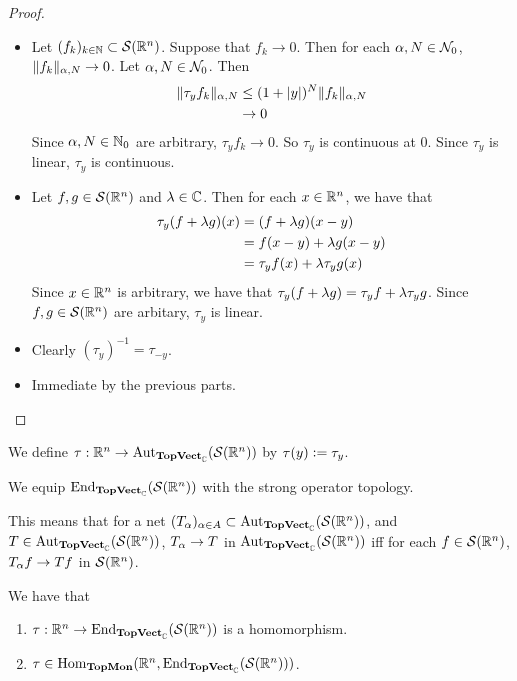 \documentclass{book}
\begin{document}
	\begin{proof}\
		\begin{itemize}
			\item Let $(f_k)_{k \in \mathbb{N}} \subset \mathcal{S}(\mathbb{R}^n)$. Suppose that $f_k \rightarrow 0$. Then for each $\alpha,N \in \mathcal{N}_0$, $\|f_k\|_{\alpha, N} \rightarrow 0$. 
			Let $\alpha,N \in \mathcal{N}_0$. Then 
			\begin{align*}
				\|\tau_yf_k\|_{\alpha, N} 
				& \leq (1 + |y|)^N\|f_k\|_{\alpha, N} \\
				& \rightarrow 0
			\end{align*}
			Since $\alpha, N \in \mathbb{N}_0$ are arbitrary, $\tau_yf_k \rightarrow 0$. So $\tau_y$  is continuous at $0$. Since $\tau_y$ is linear, $\tau_y$ is continuous.
			\item Let $f, g \in \mathcal{S}(\mathbb{R}^n)$ and $\lambda \in \mathbb{C}$. Then for each $x \in \mathbb{R}^n$, we have that
			\begin{align*}
				\tau_y(f + \lambda g)(x) 
				& = (f+ \lambda g)(x-y) \\
				& = f(x -y) + \lambda g(x-y) \\
				& = \tau_y f (x) + \lambda \tau_y g(x)
			\end{align*}
			Since $x \in \mathbb{R}^n$ is arbitrary, we have that $\tau_y (f + \lambda g) = \tau_y f + \lambda \tau_y g$. Since $f, g \in \mathcal{S}(\mathbb{R}^n)$ are arbitary, $\tau_y$ is linear. 
			\item Clearly $(\tau_y)^{-1} = \tau_{-y}$.
			\item Immediate by the previous parts.
		\end{itemize}
	\end{proof}

	\begin{defn}
		We define $\tau: \mathbb{R}^n \rightarrow \operatorname{Aut}_{\operatorname*{\text{\textbf{TopVect}}}_{\mathbb{C}}}(\mathcal{S}(\mathbb{R}^n))$ by $\tau(y) \vcentcolon= \tau_y$.  
	\end{defn}

	\begin{defn}
		We equip $\operatorname{\text{End}}_{\operatorname*{\text{\textbf{TopVect}}}_{\mathbb{C}}}(\mathcal{S}(\mathbb{R}^n))$ with the strong operator topology. 
	\end{defn}

	\begin{note}
		This means that for a net $(T_{\alpha})_{\alpha \in A} \subset \operatorname{Aut}_{\operatorname*{\text{\textbf{TopVect}}}_{\mathbb{C}}}(\mathcal{S}(\mathbb{R}^n))$, and $T \in \operatorname{Aut}_{\operatorname*{\text{\textbf{TopVect}}}_{\mathbb{C}}}(\mathcal{S}(\mathbb{R}^n))$, $T_{\alpha} \rightarrow T$ in $\operatorname{Aut}_{\operatorname*{\text{\textbf{TopVect}}}_{\mathbb{C}}}(\mathcal{S}(\mathbb{R}^n))$ iff for each $f \in \mathcal{S}(\mathbb{R}^n)$, $T_{\alpha}f \rightarrow Tf$ in $\mathcal{S}(\mathbb{R}^n)$. 
	\end{note}

	\begin{ex}
		We have that
		\begin{enumerate}
			\item $\tau: \mathbb{R}^n \rightarrow \operatorname{\text{End}}_{\operatorname*{\text{\textbf{TopVect}}}_{\mathbb{C}}}(\mathcal{S}(\mathbb{R}^n))$ is a homomorphism.
			\item $\tau \in \operatorname{Hom}_{\operatorname*{\text{\textbf{TopMon}}}}(\mathbb{R}^n, \operatorname{\text{End}}_{\operatorname*{\text{\textbf{TopVect}}}_{\mathbb{C}}}(\mathcal{S}(\mathbb{R}^n)))$. 
		\end{enumerate}
	\end{ex}
\end{document}
